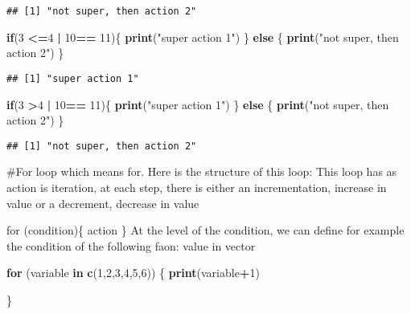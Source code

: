 \documentclass[
]{article}
\newenvironment{Shaded}{\begin{snugshade}}{\end{snugshade}}
\newcommand{\ControlFlowTok}[1]{\textcolor[rgb]{0.13,0.29,0.53}{\textbf{#1}}}
\newcommand{\DecValTok}[1]{\textcolor[rgb]{0.00,0.00,0.81}{#1}}
\newcommand{\FunctionTok}[1]{\textcolor[rgb]{0.13,0.29,0.53}{\textbf{#1}}}
\newcommand{\NormalTok}[1]{#1}
\newcommand{\SpecialCharTok}[1]{\textcolor[rgb]{0.81,0.36,0.00}{\textbf{#1}}}
\newcommand{\StringTok}[1]{\textcolor[rgb]{0.31,0.60,0.02}{#1}}
\begin{document}
\begin{verbatim}
## [1] "not super, then action 2"
\end{verbatim}

\begin{Shaded}
\begin{Highlighting}[]
\ControlFlowTok{if}\NormalTok{(}\DecValTok{3} \SpecialCharTok{\textless{}=}\DecValTok{4} \SpecialCharTok{|} \DecValTok{10}\SpecialCharTok{==} \DecValTok{11}\NormalTok{)\{}
  \FunctionTok{print}\NormalTok{(}\StringTok{"super action 1"}\NormalTok{)}
\NormalTok{\} }\ControlFlowTok{else}\NormalTok{ \{}
  \FunctionTok{print}\NormalTok{(}\StringTok{"not super, then action 2"}\NormalTok{)}
\NormalTok{\}}
\end{Highlighting}
\end{Shaded}

\begin{verbatim}
## [1] "super action 1"
\end{verbatim}

\begin{Shaded}
\begin{Highlighting}[]
\ControlFlowTok{if}\NormalTok{(}\DecValTok{3} \SpecialCharTok{\textgreater{}}\DecValTok{4} \SpecialCharTok{|} \DecValTok{10}\SpecialCharTok{==} \DecValTok{11}\NormalTok{)\{}
  \FunctionTok{print}\NormalTok{(}\StringTok{"super action 1"}\NormalTok{)}
\NormalTok{\} }\ControlFlowTok{else}\NormalTok{ \{}
  \FunctionTok{print}\NormalTok{(}\StringTok{"not super, then action 2"}\NormalTok{)}
\NormalTok{\}}
\end{Highlighting}
\end{Shaded}

\begin{verbatim}
## [1] "not super, then action 2"
\end{verbatim}

\#For loop which means for. Here is the structure of this loop: This
loop has as action is iteration, at each step, there is either an
incrementation, increase in value or a decrement, decrease in value

for (condition)\{ action \} At the level of the condition, we can define
for example the condition of the following faon: value in vector

\begin{Shaded}
\begin{Highlighting}[]
\ControlFlowTok{for}\NormalTok{ (variable }\ControlFlowTok{in} \FunctionTok{c}\NormalTok{(}\DecValTok{1}\NormalTok{,}\DecValTok{2}\NormalTok{,}\DecValTok{3}\NormalTok{,}\DecValTok{4}\NormalTok{,}\DecValTok{5}\NormalTok{,}\DecValTok{6}\NormalTok{)) \{}
\FunctionTok{print}\NormalTok{(variable}\SpecialCharTok{+}\DecValTok{1}\NormalTok{)  }

\NormalTok{\}}
\end{Highlighting}
\end{Shaded}
\end{document}
